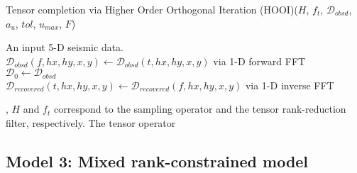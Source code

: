\begin{algorithm}[H] \caption{Tensor completion via Higher Order Orthogonal Iteration (HOOI)(${H}$, ${f_t}$, $\mathcal{D}_{obsd}$, {$a_{u}$}, $tol$, $u_{max}$, ${F}$)}
	\label{alg:alg2}
	\begin{algorithmic}[1] 
\Require An input 5-D seismic data.\\

$\mathcal{D}_{obsd}(f, hx, hy, x, y)\leftarrow \mathcal{D}_{obsd}(t, hx, hy, x, y)$ via 1-D forward FFT\\
$\mathcal{D}_0\leftarrow\mathcal{D}_{obsd}$\;
		\EndFor\\
		$\mathcal{D}_{recovered}(t,hx, hy, x, y)\leftarrow\mathcal{D}_{recovered}(f,hx, hy, x, y)$ via 1-D inverse FFT\;
	\end{algorithmic}
\end{algorithm}
	
, ${H}$ and ${f}_{t}$ correspond to the sampling operator and the tensor rank-reduction filter, respectively. The tensor operator 

\subsection{Model 3: Mixed rank-constrained model}

